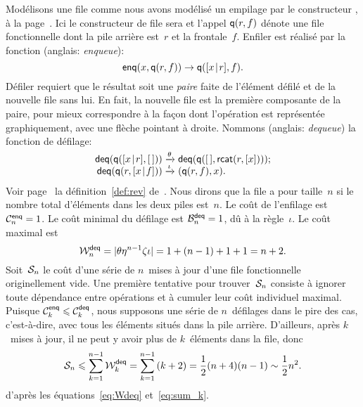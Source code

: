 Modélisons une file comme nous avons modélisé un empilage par le
constructeur , à la
page~\pageref{par:stacks}. Ici le constructeur de file sera
 et l'appel \(\fun{q}(r,f)\) dénote une
file fonctionnelle dont la pile arrière est~\(r\) et la
frontale~\(f\). Enfiler est réalisé par la fonction
 (anglais: \emph{enqueue}):
\begin{equation}
\fun{enq}(x,\fun{q}(r,f)) \rightarrow \fun{q}(\cons{x}{r},f).
\label{def:enq}
\end{equation}
Défiler requiert que le résultat soit une \emph{paire} faite de l'élément défilé et de la nouvelle file
sans lui. En fait, la nouvelle file est la première composante de la
paire, pour mieux correspondre à la façon dont l'opération est
représentée graphiquement, avec une flèche pointant à droite.
Nommons  (anglais: \emph{dequeue})
la fonction de défilage:
\begin{equation}
\begin{array}{@{}r@{\;}l@{\;}l@{}}
  \fun{deq}(\fun{q}(\cons{x}{r},\el))
& \xrightarrow{\smash{\theta}}
& \fun{deq}(\fun{q}(\el,\fun{rcat}(r,[x])));\\
  \fun{deq}(\fun{q}(r,\cons{x}{f}))
& \xrightarrow{\smash{\iota}}
& \pair{\fun{q}(r,f)}{x}.
\end{array}
\label{def:deq}
\end{equation}
Voir page~\pageref{def:rev} la définition~\eqref{def:rev}
de~. Nous dirons que la file a
pour taille~\(n\) si le nombre total d'éléments dans les deux piles
est~\(n\).  Le coût de l'enfilage est
\(\C{\fun{enq}}{n} = 1\). Le coût
minimal du défilage est
\(\B{\fun{deq}}{n} = 1\), dû à la règle~\(\iota\). Le coût maximal est
\begin{equation}
  \W{\fun{deq}}{n} = \len{\theta\eta^{n-1}\zeta\iota} = 1 + (n-1)
+ 1 + 1 = n + 2. \label{eq:Wdeq}
\end{equation}
Soit~\(\A{n}\) le coût d'une série de \(n\)~mises à jour d'une file
fonctionnelle originellement vide. Une première tentative pour
trouver~\(\A{n}\) consiste à ignorer toute dépendance entre opérations
et à cumuler leur coût individuel maximal. Puisque \(\C{\fun{enq}}{k}
\leqslant \C{\fun{deq}}{k}\), nous supposons une série de
\(n\)~défilages dans le pire des cas, c'est-à-dire, avec tous les
éléments situés dans la pile arrière. D'ailleurs, après \(k\)~mises à
jour, il ne peut y avoir plus de \(k\)~éléments dans la file, donc
\begin{equation}
  \A{n} \leqslant \sum_{k=1}^{n-1}{\W{\fun{deq}}{k}} =
  \sum_{k=1}^{n-1}{(k+2)} =
  \frac{1}{2}(n+4)(n-1) \sim \frac{1}{2}{n^2}.
  \label{ineq:Sn_upper_bound}
\end{equation}
d'après les équations~\eqref{eq:Wdeq} et~\eqref{eq:sum_k}.


